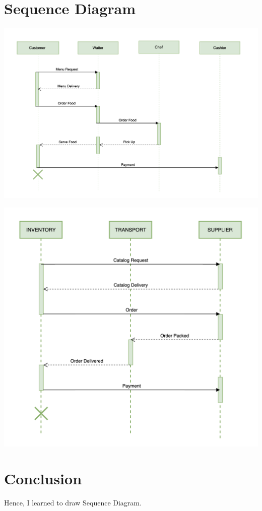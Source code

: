 \documentclass{article}
\begin{document}
\section{\textbf{Sequence Diagram}}
\begin{center}
	\includegraphics[scale = 0.5]{Sequence Diagram.png}
\end{center}
\begin{center}
	\includegraphics[scale = 0.5]{Sequence Diagram 2.png}
\end{center}
\section{\textbf{Conclusion}}
Hence, I learned to draw Sequence Diagram.
\end{document}
